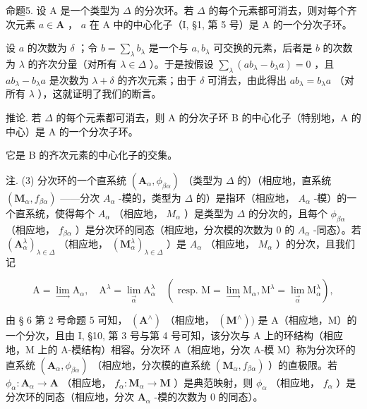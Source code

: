 命题5. 设 A 是一个类型为 \(\Delta\) 的分次环。若 \(\Delta\) 的每个元素都可消去，则对每个齐次元素 \(a \in \mathbf{A}\) ， \(a\) 在 A 中的中心化子（I, §1, 第 5 号）是 A 的一个分次子环。

设 \(a\) 的次数为 \(\delta\) ；令 \(b = \sum_{\lambda} b_{\lambda}\) 是一个与 \(a, b_{\lambda}\) 可交换的元素，后者是 \(b\) 的次数为 \(\lambda\) 的齐次分量（对所有 \(\lambda \in \Delta\) ）。于是按假设 \(\sum_{\lambda} (ab_{\lambda} - b_{\lambda}a) = 0\) ，且 \(ab_{\lambda} - b_{\lambda}a\) 是次数为 \(\lambda + \delta\) 的齐次元素；由于 \(\delta\) 可消去，由此得出 \(ab_{\lambda} = b_{\lambda}a\) （对所有 \(\lambda\) ），这就证明了我们的断言。

推论. 若 \(\Delta\) 的每个元素都可消去，则 A 的分次子环 B 的中心化子（特别地，A 的中心）是 A 的一个分次子环。

它是 B 的齐次元素的中心化子的交集。

注. (3) 分次环的一个直系统 \((\mathbf{A}_{\alpha}, \phi_{\beta\alpha})\) （类型为 \(\Delta\) 的）（相应地，直系统 \((\mathbf{M}_{\alpha}, f_{\beta\alpha})\) ——分次 \(A_{\alpha}\) -模的，类型为 \(\Delta\) 的）是指环（相应地， \(A_{\alpha}\) -模）的一个直系统，使得每个 \(A_{\alpha}\) （相应地， \(M_{\alpha}\) ）是类型为 \(\Delta\) 的分次的，且每个 \(\phi_{\beta\alpha}\) （相应地， \(f_{\beta\alpha}\) ）是分次环的同态（相应地，分次模的次数为 0 的 \(A_{\alpha}\) -同态）。若 \((\mathbf{A}_{\alpha}^{\lambda})_{\lambda \in \Delta}\) （相应地， \((\mathbf{M}_{\alpha}^{\lambda})_{\lambda \in \Delta}\) ）是 \(A_{\alpha}\) （相应地， \(M_{\alpha}\) ）的分次，且我们记

\[
\mathrm{A} = \lim _ {\rightarrow} \mathrm{A} _ {\alpha}, \quad \mathrm{A} ^ {\lambda} = \lim _ {\overrightarrow {\alpha}} \mathrm{A} _ {\alpha} ^ {\lambda} \quad (\text { resp.   } \mathrm{M} = \lim _ {\rightarrow} \mathrm{M} _ {\alpha}, \mathrm{M} ^ {\lambda} = \lim _ {\overrightarrow {\alpha}} \mathrm{M} _ {\alpha} ^ {\lambda}),
\]

由 § 6 第 2 号命题 5 可知， \((\mathbf{A}^{\wedge})\) （相应地， \((\mathbf{M}^{\wedge}))\) 是 A（相应地，M）的一个分次，且由 I, §10, 第 3 号与第 4 号可知，该分次与 A 上的环结构（相应地，M 上的 A-模结构）相容。分次环 A（相应地，分次 A-模 M）称为分次环的直系统 \((\mathbf{A}_{\alpha}, \phi_{\beta \alpha})\) （相应地，分次模的直系统 \((\mathbf{M}_{\alpha}, f_{\beta \alpha})\) ）的直极限。若 \(\phi_{\alpha} \colon \mathbf{A}_{\alpha} \to \mathbf{A}\) （相应地， \(f_{\alpha} \colon \mathbf{M}_{\alpha} \to \mathbf{M}\) ）是典范映射，则 \(\phi_{\alpha}\) （相应地， \(f_{\alpha}\) ）是分次环的同态（相应地，分次 \(\mathbf{A}_{\alpha}\) -模的次数为 0 的同态）。

